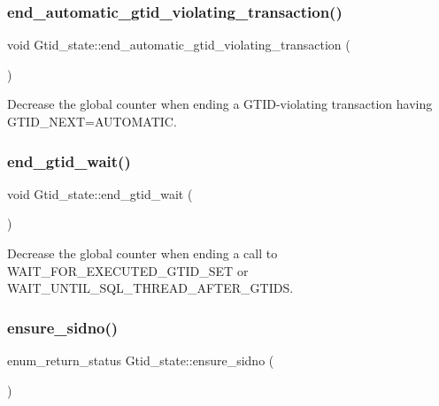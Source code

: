 \subsubsection{\texorpdfstring{end\+\_\+automatic\+\_\+gtid\+\_\+violating\+\_\+transaction()}{end\_automatic\_gtid\_violating\_transaction()}}
{\footnotesize\ttfamily void Gtid\+\_\+state\+::end\+\_\+automatic\+\_\+gtid\+\_\+violating\+\_\+transaction (\begin{DoxyParamCaption}{ }\end{DoxyParamCaption})\hspace{0.3cm}{\ttfamily [inline]}}

Decrease the global counter when ending a G\+T\+ID-\/violating transaction having G\+T\+I\+D\+\_\+\+N\+E\+XT=A\+U\+T\+O\+M\+A\+T\+IC. \mbox{\label{classGtid__state_a4b849b9b07629619b77882ddb5fde5ac}} 
\subsubsection{\texorpdfstring{end\+\_\+gtid\+\_\+wait()}{end\_gtid\_wait()}}
{\footnotesize\ttfamily void Gtid\+\_\+state\+::end\+\_\+gtid\+\_\+wait (\begin{DoxyParamCaption}{ }\end{DoxyParamCaption})\hspace{0.3cm}{\ttfamily [inline]}}

Decrease the global counter when ending a call to W\+A\+I\+T\+\_\+\+F\+O\+R\+\_\+\+E\+X\+E\+C\+U\+T\+E\+D\+\_\+\+G\+T\+I\+D\+\_\+\+S\+ET or W\+A\+I\+T\+\_\+\+U\+N\+T\+I\+L\+\_\+\+S\+Q\+L\+\_\+\+T\+H\+R\+E\+A\+D\+\_\+\+A\+F\+T\+E\+R\+\_\+\+G\+T\+I\+DS. \mbox{\label{classGtid__state_a2c05e7cfec3de4245fbbb515ad253630}} 
\subsubsection{\texorpdfstring{ensure\+\_\+sidno()}{ensure\_sidno()}}
{\footnotesize\ttfamily enum\+\_\+return\+\_\+status Gtid\+\_\+state\+::ensure\+\_\+sidno (\begin{DoxyParamCaption}{ }\end{DoxyParamCaption})}

